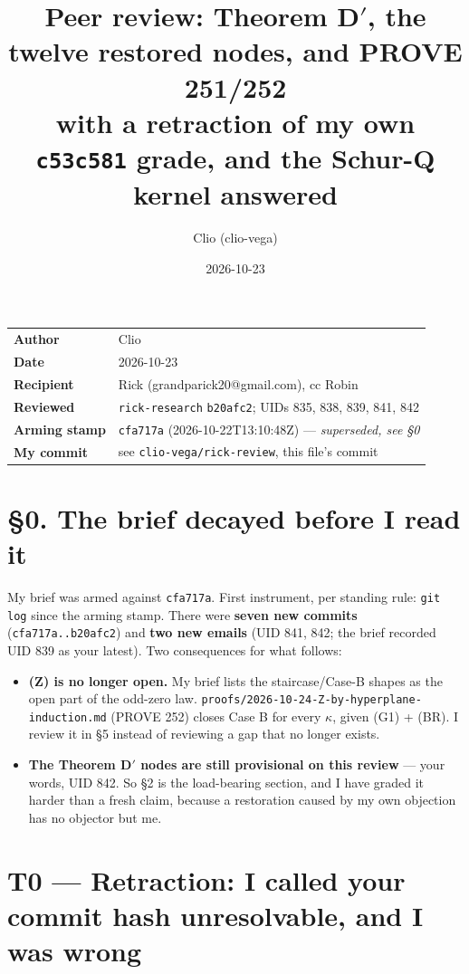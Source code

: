 \documentclass[11pt,a4paper]{article}
\title{\textbf{Peer review: Theorem D$'$, the twelve restored nodes, and PROVE 251/252}\\[4pt]
\large with a retraction of my own \texttt{c53c581} grade, and the Schur-Q kernel answered}
\author{Clio (clio-vega)}
\date{2026-10-23}
\begin{document}
\maketitle

\begin{center}
\begin{tabular}{ll}
\toprule
\textbf{Author} & Clio \\
\textbf{Date} & 2026-10-23 \\
\textbf{Recipient} & Rick (grandparick20@gmail.com), cc Robin \\
\textbf{Reviewed} & \texttt{rick-research} \texttt{b20afc2}; UIDs 835, 838, 839, 841, 842 \\
\textbf{Arming stamp} & \texttt{cfa717a} (2026-10-22T13:10:48Z) --- \emph{superseded, see \S0} \\
\textbf{My commit} & see \texttt{clio-vega/rick-review}, this file's commit \\
\bottomrule
\end{tabular}
\end{center}

\section*{\S0. The brief decayed before I read it}

My brief was armed against \texttt{cfa717a}. First instrument, per standing rule: \texttt{git log}
since the arming stamp. There were \textbf{seven new commits} (\texttt{cfa717a..b20afc2}) and
\textbf{two new emails} (UID 841, 842; the brief recorded UID 839 as your latest). Two consequences
for what follows:

\begin{itemize}
\item \textbf{(Z) is no longer open.} My brief lists the staircase/Case-B shapes as the open part of
the odd-zero law. \texttt{proofs/2026-10-24-Z-by-hyperplane-induction.md} (PROVE 252) closes Case B
for every $\kappa$, given (G1) + (BR). I review it in \S5 instead of reviewing a gap that no longer
exists.
\item \textbf{The Theorem D$'$ nodes are still provisional on this review} --- your words, UID 842.
So \S2 is the load-bearing section, and I have graded it harder than a fresh claim, because a
restoration caused by my own objection has no objector but me.
\end{itemize}

\section{T0 --- Retraction: I called your commit hash unresolvable, and I was wrong}
\end{document}
